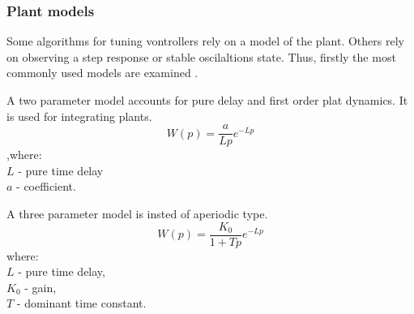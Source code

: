 \subsubsection{Plant models}
Some algorithms for tuning vontrollers rely on a model of the plant.
Others rely on observing a step response or stable oscilaltions state.
Thus, firstly the most commonly used models are examined \cite[p55]{garipov}.
\par
A two parameter model accounts for pure delay and first order plat dynamics.
It is used for integrating plants.
\begin{equation}
    W(p) = \frac{a}{L p} e^{- L p}
\end{equation}
,where:  \\
$L$ - pure time delay \\
$a$ - coefficient.
\par
A three parameter model is insted of aperiodic type.
\begin{equation}
    W(p) = \frac{K_0}{1 + T p} e^{-Lp}
\end{equation}
where:  \\
$L$ - pure time delay,  \\
$K_0$ - gain,  \\
$T$ - dominant time constant.

